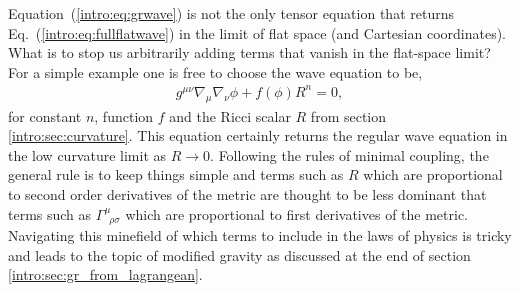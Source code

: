 Equation~(\ref{intro:eq:grwave}) is not the only tensor equation that returns Eq.~(\ref{intro:eq:fullflatwave}) in the limit of flat space (and Cartesian coordinates). What is to stop us arbitrarily adding terms that vanish in the flat-space limit? For a simple example one is free to choose the wave equation to be,
\begin{align}
g^{\mu\nu}\nabla_\mu\nabla_\nu \phi + f(\phi) R^n = 0, \label{intro:eq:modified_wave}
\end{align}
for constant $n$, function $f$ and the Ricci scalar $R$ from section \ref{intro:sec:curvature}. This equation certainly returns the regular wave equation in the low curvature limit as $R\rightarrow 0$. Following the rules of minimal coupling, the general rule is to keep things simple and terms such as $R$ which are proportional to second order derivatives of the metric are thought to be less dominant that terms such as $\Gamma^\mu_{\,\,\,\rho\sigma}$ which are proportional to first derivatives of the metric. Navigating this minefield of which terms to include in the laws of physics is tricky and leads to the topic of modified gravity as discussed at the end of section \ref{intro:sec:gr_from_lagrangean}.







